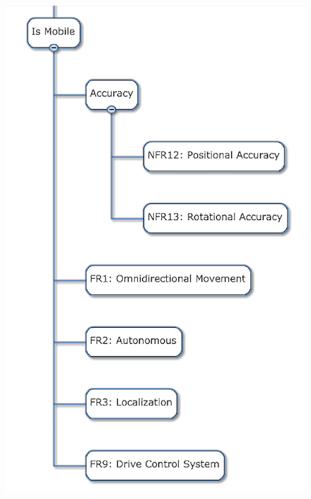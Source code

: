 \begin{figure}[h!]
\centering
\includegraphics[width=0.98\columnwidth]{figs/objectives_tree/objectives_tree_mobile.png}
\label{fig:obj_tree_mobile}
\end{figure}
